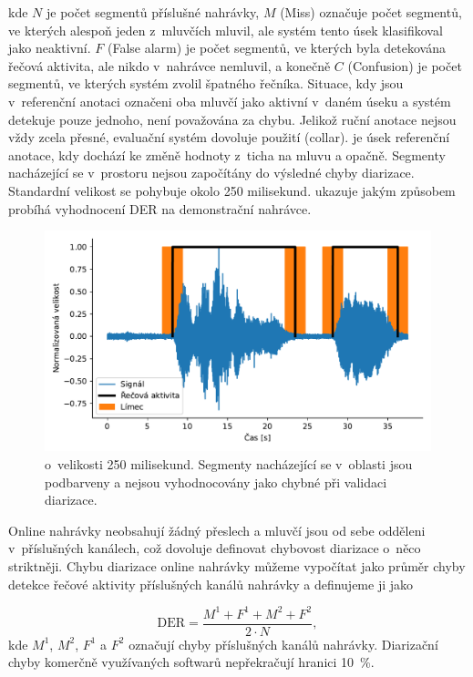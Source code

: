kde $N$ je počet segmentů příslušné nahrávky, $M$ (Miss) označuje počet segmentů, ve kterých alespoň jeden z~mluvčích mluvil, ale systém tento úsek klasifikoval jako neaktivní. $F$ (False alarm) je počet segmentů, ve kterých byla detekována řečová aktivita, ale nikdo v~nahrávce nemluvil, a konečně $C$ (Confusion) je počet segmentů, ve kterých systém zvolil špatného řečníka. Situace, kdy jsou v~referenční anotaci označeni oba mluvčí jako aktivní v~daném úseku a systém detekuje pouze jednoho, není považována za chybu. Jelikož ruční anotace nejsou vždy zcela přesné, evaluační systém dovoluje použití  (collar).  je úsek referenční anotace, kdy dochází ke změně hodnoty z~ticha na mluvu a opačně. Segmenty nacházející se v~prostoru  nejsou započítány do výsledné chyby diarizace. Standardní velikost  se pohybuje okolo 250 milisekund.  ukazuje jakým způsobem probíhá vyhodnocení DER na demonstrační nahrávce.

\begin{figure}[ht]
  \centering
  \includegraphics[width=\linewidth]{obrazky-figures/collar.pdf}
  \caption{ o~velikosti 250 milisekund. Segmenty nacházející se v~oblasti  jsou podbarveny a nejsou vyhodnocovány jako chybné při validaci diarizace.}
  \label{fig:Collar}
\end{figure}


Online nahrávky neobsahují žádný přeslech a mluvčí jsou od sebe odděleni v~příslušných kanálech, což dovoluje definovat chybovost diarizace o~něco striktněji. Chybu diarizace online nahrávky můžeme vypočítat jako průměr chyby detekce řečové aktivity příslušných kanálů nahrávky a definujeme ji jako

\begin{equation}
\label{eqn:DER_online}
    \text{DER} = \frac{M^{1} + F^{1} + M^{2} + F^{2}}{ 2 \cdot N},
\end{equation}
kde $M^{1}$, $M^{2}$, $F^{1}$ a $F^{2}$ označují chyby příslušných kanálů nahrávky. Diarizační chyby komerčně využívaných softwarů nepřekračují hranici 10~\%.


